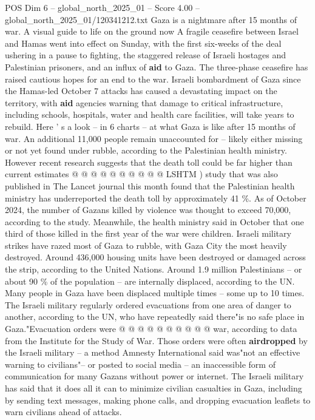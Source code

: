 \begin{textsample}{POS Dim 6 – global\_north\_2025\_01 – Score 4.00 – global\_north\_2025\_01/120341212.txt}  \label{ex:f6_pos_349}
Gaza is a nightmare after 15 months of war.
A visual guide to life on the ground now A fragile ceasefire between Israel and Hamas went into effect on Sunday, with the first six-weeks of the deal ushering in a pause to fighting, the staggered release of Israeli hostages and Palestinian prisoners, and an influx of \textbf{aid} to Gaza.
The three-phase ceasefire has raised cautious hopes for an end to the war.
Israeli bombardment of Gaza since the Hamas-led October 7 attacks has caused a devastating impact on the territory, with \textbf{aid} agencies warning that damage to critical infrastructure, including schools, hospitals, water and health care facilities, will take years to rebuild.
Here ' s a look -- in 6 charts -- at what Gaza is like after 15 months of war.
An additional 11,000 people remain unaccounted for -- likely either missing or not yet found under rubble, according to the Palestinian health ministry.
However recent research suggests that the death toll could be far higher than current estimates @ @ @ @ @ @ @ @ @ @ LSHTM ) study that was also published in The Lancet journal this month found that the Palestinian health ministry has underreported the death toll by approximately 41 \%.
As of October 2024, the number of Gazans killed by violence was thought to exceed 70,000, according to the study.
Meanwhile, the health ministry said in October that one third of those killed in the first year of the war were children.
Israeli military strikes have razed most of Gaza to rubble, with Gaza City the most heavily destroyed.
Around 436,000 housing units have been destroyed or damaged across the strip, according to the United Nations.
Around 1.9 million Palestinians -- or about 90 \% of the population -- are internally displaced, according to the UN.
Many people in Gaza have been displaced multiple times -- some up to 10 times.
The Israeli military regularly ordered evacuations from one area of danger to another, according to the UN, who have repeatedly said there"is no safe place in Gaza."Evacuation orders were @ @ @ @ @ @ @ @ @ @ war, according to data from the Institute for the Study of War.
Those orders were often \textbf{airdropped} by the Israeli military -- a method Amnesty International said was"not an effective warning to civilians"-- or posted to social media -- an inaccessible form of communication for many Gazans without power or internet.
The Israeli military has said that it does all it can to minimize civilian casualties in Gaza, including by sending text messages, making phone calls, and dropping evacuation leaflets to warn civilians ahead of attacks.

\end{textsample}
